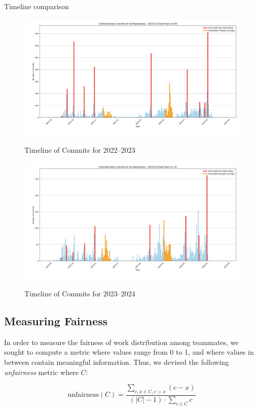 \documentclass[10pt, conference]{IEEEtran}
\begin{document}
Timeline comparison

\begin{figure}[h!]
\begin{center}
{
     \includegraphics[width=0.75\columnwidth]{./figures/Yr22_23_DailyCommitsTimeline.png}
}
\caption{\label{Fig_22_23Timeline} Timeline of Commits for 2022--2023}
\end{center}
\end{figure}
  
\begin{figure}[h!]
\begin{center}
{
     \includegraphics[width=0.75\columnwidth]{./figures/Yr23_24_DailyCommitsTimeline.png}
}
\caption{\label{Fig_23_24Timeline} Timeline of Commits for 2023--2024}
\end{center}
\end{figure}

\subsection{Measuring Fairness}

In order to measure the fairness of work distribution among teammates,
we sought to compute a metric where values range from 0 to 1, and where values
in between contain meaningful information.
Thus, we devised the following \textit{unfairness} metric where $C$:

$$
\text{unfairness}(C) = \frac{ \sum\limits_{c, x \in C, c > x} (c-x)}{(\left|C\right| -
1) \cdot \sum\limits_{c \in C} c}
$$
\end{document}
